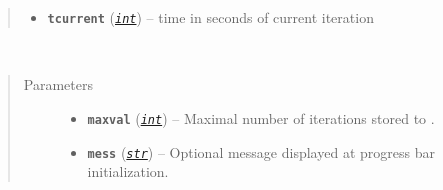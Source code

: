 \documentclass[a4paper,10pt,english]{sphinxmanual}
\begin{document}
\begin{fulllineitems}
\begin{quote}
\begin{description}
\begin{itemize}
\item {} 
\textbf{\texttt{tcurrent}} (\href{http://docs.python.org/2/library/functions.html\#int}{\emph{\texttt{int}}}) -- time in seconds of current iteration

\end{itemize}

\end{description}\end{quote}

\begin{fulllineitems}
\label{aqueduct.utils.log:aqueduct.utils.log.SimpleProgressBar.rotate}
\end{fulllineitems}


\begin{fulllineitems}
\label{aqueduct.utils.log:aqueduct.utils.log.SimpleProgressBar.barlenght}
\end{fulllineitems}


\begin{fulllineitems}
\label{aqueduct.utils.log:aqueduct.utils.log.SimpleProgressBar.__init__}~\begin{quote}\begin{description}
\item[{Parameters}] \leavevmode\begin{itemize}
\item {} 
\textbf{\texttt{maxval}} (\href{http://docs.python.org/2/library/functions.html\#int}{\emph{\texttt{int}}}) -- Maximal number of iterations stored to .

\item {} 
\textbf{\texttt{mess}} (\href{http://docs.python.org/2/library/functions.html\#str}{\emph{\texttt{str}}}) -- Optional message displayed at progress bar initialization.

\end{itemize}

\end{description}\end{quote}

\end{fulllineitems}


\end{fulllineitems}
\end{document}

